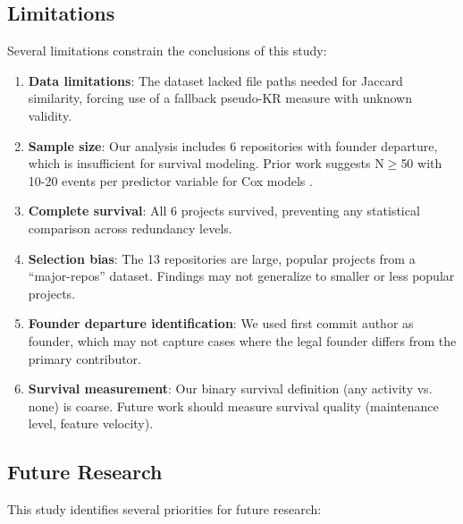 \documentclass[11pt,letterpaper]{article}
\begin{document}
\subsection{Limitations}

Several limitations constrain the conclusions of this study:

\begin{enumerate}
    \item \textbf{Data limitations}: The dataset lacked file paths needed for Jaccard similarity, forcing use of a fallback pseudo-KR measure with unknown validity.
    
    \item \textbf{Sample size}: Our analysis includes 6 repositories with founder departure, which is insufficient for survival modeling. Prior work suggests N$\geq$50 with 10-20 events per predictor variable for Cox models \cite{Avelino2019}.
    
    \item \textbf{Complete survival}: All 6 projects survived, preventing any statistical comparison across redundancy levels.
    
    \item \textbf{Selection bias}: The 13 repositories are large, popular projects from a ``major-repos'' dataset. Findings may not generalize to smaller or less popular projects.
    
    \item \textbf{Founder departure identification}: We used first commit author as founder, which may not capture cases where the legal founder differs from the primary contributor.
    
    \item \textbf{Survival measurement}: Our binary survival definition (any activity vs. none) is coarse. Future work should measure survival quality (maintenance level, feature velocity).
\end{enumerate}

\subsection{Future Research}

This study identifies several priorities for future research:
\end{document}
